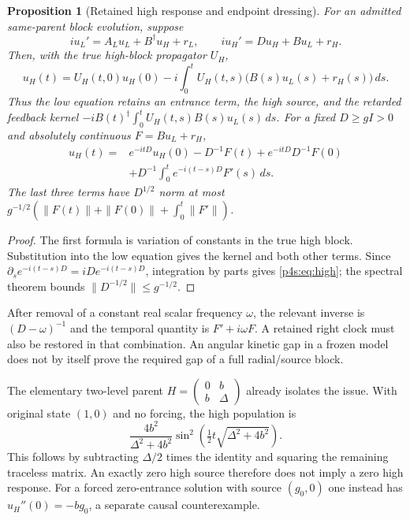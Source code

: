 \documentclass[11pt]{article}
\numberwithin{equation}{section}
\newtheorem{proposition}[theorem]{Proposition}
\theoremstyle{definition}
\theoremstyle{remark}
\begin{document}
\begin{proposition}[Retained high response and endpoint dressing]
\label{p4s:prop:feedback}
For an admitted same-parent block evolution, suppose
\[
 i u_L'=A_Lu_L+B^\dagger u_H+r_L,\qquad
 i u_H'=Du_H+Bu_L+r_H .
\]
Then, with the true high-block propagator $U_H$,
\[
 u_H(t)=U_H(t,0)u_H(0)
       -i\int_0^tU_H(t,s)\bigl(B(s)u_L(s)+r_H(s)\bigr)\,ds .
\]
Thus the low equation retains an entrance term, the high source,
and the retarded feedback kernel
$-iB(t)^\dagger\int_0^tU_H(t,s)B(s)u_L(s)\,ds$.
For a fixed $D\geq gI>0$ and absolutely continuous
$F=Bu_L+r_H$,
\begin{align}\label{p4s:eq:high}
 u_H(t)={}&e^{-itD}u_H(0)-D^{-1}F(t)
             +e^{-itD}D^{-1}F(0)\\
          &+D^{-1}\int_0^te^{-i(t-s)D}F'(s)\,ds .\nonumber
\end{align}
The last three terms have $D^{1/2}$ norm at most
$g^{-1/2}(\|F(t)\|+\|F(0)\|+\int_0^t\|F'\|)$.
\end{proposition}
\begin{proof}
The first formula is variation of constants in the true high block.
Substitution into the low equation gives the kernel and both other
terms. Since $\partial_se^{-i(t-s)D}=iDe^{-i(t-s)D}$,
integration by parts gives \eqref{p4s:eq:high}; the spectral theorem
bounds $\|D^{-1/2}\|\leq g^{-1/2}$.
\end{proof}

After removal of a constant real scalar frequency $\omega$, the relevant inverse
is $(D-\omega)^{-1}$ and the temporal quantity is $F'+i\omega F$.
A retained right clock must also be restored in that combination.
An angular kinetic gap in a frozen model does not by itself prove
the required gap of a full radial/source block.

The elementary two-level parent
$H=\left(\begin{smallmatrix}0&b\\b&\Delta\end{smallmatrix}\right)$
already isolates the issue. With original state $(1,0)$ and no forcing,
the high population is
\[
 \frac{4b^2}{\Delta^2+4b^2}
 \sin^2\!\left(\tfrac12t\sqrt{\Delta^2+4b^2}\right).
\]
This follows by subtracting $\Delta/2$ times the identity and squaring
the remaining traceless matrix. An exactly zero high source therefore
does not imply a zero high response. For a forced zero-entrance
solution with source $(g_0,0)$ one instead has
$u_H''(0)=-bg_0$, a separate causal counterexample.
\end{document}
